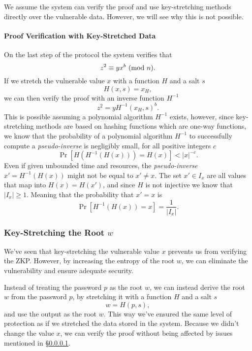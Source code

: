 We assume the system can verify the proof and use key-stretching methods directly over the vulnerable data. 
However, we will see why this is not possible.

\paragraph{Proof Verification with Key-Stretched Data}
\label{paragraph:problems-with-key-stretch}
On the last step of the protocol the system verifies that
$$ z^2 \equiv yx^b \ (\mathrm{mod}\ n).$$
If we stretch the vulnerable value $x$ with a function $H$ and a salt $s$
$$H(x, s) = x_H,$$
we can then verify the proof with an inverse function $H^{-1}$
$$z^2 = yH^{-1}(x_H, s)^b.$$
This is possible assuming a polynomial algorithm $H^{-1}$ exists, however, since key-stretching methods are based on hashing functions which are one-way functions, we know that the probability of a polynomial algorithm $H^{-1}$ to successfully compute a \textit{pseudo-inverse} is negligibly small, for all positive integers $c$ \cite{goldreich2007foundations}
$$\Pr[H(H^{-1}(H(x))) = H(x)] < |x|^{-c}.$$
Even if given unbounded time and resources, the \textit{pseudo-inverse} $x' = H^{-1}(H(x))$ might not be equal to $x' \not = x$. 
The set $x'\in I_x$ are all values that map into $H(x) = H(x')$, and since $H$ is not injective we know that $|I_x| \ge 1$.
Meaning that the probability that $x' = x$ is
\medskip
$$\Pr[H^{-1}(H(x)) = x] = \frac{1}{|I_x|}.$$

\subsubsection{Key-Stretching the Root $w$}
We've seen that key-stretching the vulnerable value $x$ prevents us from verifying the ZKP.
However, by increasing the entropy of the root $w$, we can eliminate the vulnerability and ensure adequate security.

\bigskip
\noindent Instead of treating the password $p$ as the root $w$, we can instead derive the root $w$ from the password $p$, by stretching it with a function $H$ and a salt $s$
$$w = H(p, s),$$
and use the output as the root $w$.
This way we've ensured the same level of protection as if we stretched the data stored in the system.
Because we didn't change the value $x$, we can verify the proof without being affected by issues mentioned in \S\ref{paragraph:problems-with-key-stretch}.

